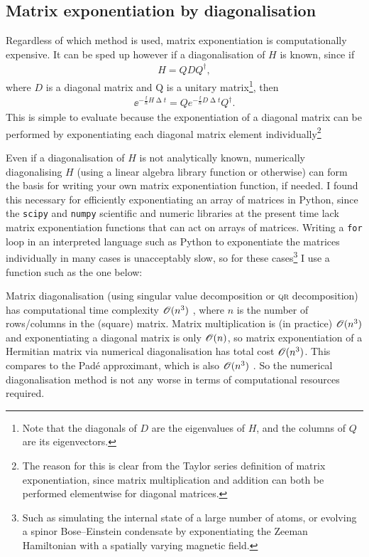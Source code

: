 \subsection{Matrix exponentiation by diagonalisation}\label{sec:matrix_exp_diagonalisation}
Regardless of which method is used, matrix exponentiation is computationally expensive. It can be sped up however if a diagonalisation of $H$ is known, since if
\begin{align}
H = QDQ^\dagger,
\end{align}
where $D$ is a diagonal matrix and Q is a unitary matrix\footnote{Note that the diagonals of $D$ are the eigenvalues of $H$, and the columns of $Q$ are its eigenvectors.}, then
\begin{align}\label{eq:diagonal_expm}
\ee^{-\frac \ii \hbar H \upDelta t} = Q e^{-\frac \ii \hbar D \upDelta t} Q^\dagger.
\end{align}
This is simple to evaluate because the exponentiation of a diagonal matrix can be performed by exponentiating each diagonal matrix element individually\footnote{The reason for this is clear from the Taylor series definition of matrix exponentiation, since matrix multiplication and addition can both be performed elementwise for diagonal matrices.}

Even if a diagonalisation of $H$ is not analytically known, numerically diagonalising $H$ (using a linear algebra library function or otherwise) can form the basis for writing your own matrix exponentiation function, if needed. I found this necessary for efficiently exponentiating an array of matrices in Python, since the \texttt{scipy} and \texttt{numpy} scientific and numeric libraries at the present time lack matrix exponentiation functions that can act on arrays of matrices. Writing a \texttt{for} loop in an interpreted language such as Python to exponentiate the matrices individually in many cases is unacceptably slow, so for these cases\footnote{Such as simulating the internal state of a large number of atoms, or evolving a spinor Bose--Einstein condensate by exponentiating the Zeeman Hamiltonian with a spatially varying magnetic field.} I use a function such as the one below:


Matrix diagonalisation (using singular value decomposition or 
\textsc{qr} decomposition) has computational time complexity $\mathscr{O}(n^3)$ , where $n$ is the number of rows/columns in the (square) matrix. Matrix multiplication is (in practice) $\mathscr{O}(n^3)$ and exponentiating a diagonal matrix is only $\mathscr{O}(n) $, so matrix exponentiation of a Hermitian matrix via numerical diagonalisation has total cost $\mathscr{O}(n^3)$. This compares to the Pad\'e approximant, which is also $\mathscr{O}(n^3)$ \cite{moler_nineteen_2003}. So the numerical diagonalisation method is not any worse in terms of computational resources required.

